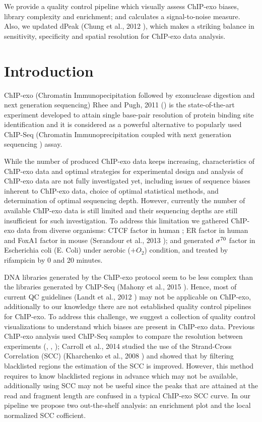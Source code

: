 \documentclass[11pt]{article}\usepackage[]{graphicx}\usepackage[]{color}
\begin{document}
    We provide a quality control pipeline which visually assess
    ChIP-exo biases, library complexity and enrichment; and calculates
    a signal-to-noise measure. Also, we updated dPeak (Chung et al.,
    2012 \cite{dpeak}), which makes a striking balance in sensitivity,
    specificity and spatial resolution for ChIP-exo data analysis.

\newpage

\section{Introduction}
\label{sec:intro}


ChIP-exo (Chromatin Immunopecipitation followed by exonuclease
digestion and next generation sequencing) Rhee and Pugh, 2011
(\cite{exo1}) is the state-of-the-art experiment developed to attain
single base-pair resolution of protein binding site identification and
it is considered as a powerful alternative to popularly used ChIP-Seq
(Chromatin Immunoprecipitation coupled with next generation sequencing
) assay.

While the number of produced ChIP-exo data keeps increasing,
characteristics of ChIP-exo data and optimal strategies for
experimental design and analysis of ChIP-exo data are not fully
investigated yet, including issues of sequence biases inherent to
ChIP-exo data, choice of optimal statistical methods, and
determination of optimal sequencing depth. However, currently the
number of available ChIP-exo data is still limited and their
sequencing depths are still insufficient for such investigation. To
address this limitation we gathered ChIP-exo data from diverse
organisms: CTCF factor in human \cite{exo1}; ER factor in human and
FoxA1 factor in mouse (Serandour et al., 2013 \cite{exoillumina}); and
generated $\sigma^{70}$ factor in Escherichia coli (E. Coli) under
aerobic ($ + O_2$) condition, and treated by rifampicin by 0 and 20
minutes.

DNA libraries generated by the ChIP-exo protocol seem to be less
complex than the libraries generated by ChIP-Seq (Mahony et al., 2015
\cite{exo_review}). Hence, most of current QC guidelines (Landt et
al., 2012 \cite{encode_qc}) may not be applicable on ChIP-exo,
additionally to our knowledge there are not established quality
control pipelines for ChIP-exo. To address this challenge, we suggest
a collection of quality control visualizations to understand which
biases are present in ChIP-exo data. Previous ChIP-exo analysis used
ChIP-Seq samples to compare the resolution between experiments
(\cite{exo1}, \cite{exo2}, \cite{exoillumina}); Carroll et al., 2014
\cite{carroll.qc} studied the use of the Strand-Cross Correlation
(SCC) (Kharchenko et al., 2008 \cite{strandcc}) and showed that by
filtering blacklisted regions the estimation of the SCC is
improved. However, this method requires to know blacklisted regions in
advance which may not be available, additionally using SCC may not be
useful since the peaks that are attained at the read and fragment
length are confused in a typical ChIP-exo SCC curve.  In our pipeline
we propose two out-the-shelf analysis: an enrichment plot and the
local normalized SCC cofficient.
\end{document}
